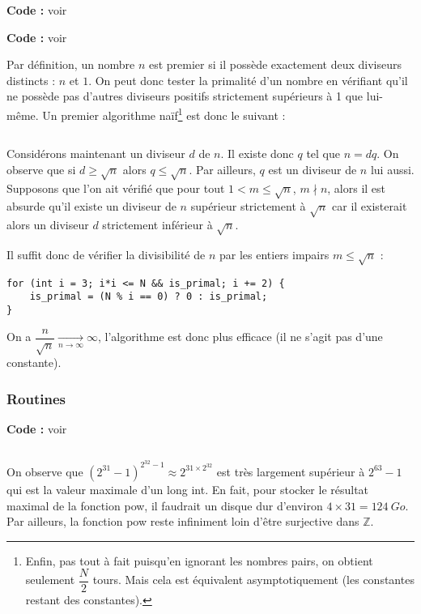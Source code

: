 \documentclass[../main.tex]{subfiles}
\begin{document}

\textbf{Code :} voir 


\textbf{Code :} voir 

\newline
Par définition, un nombre $n$ est premier si il possède exactement deux diviseurs distincts : $n$ et $1$. On peut donc tester la primalité d'un nombre en vérifiant qu'il ne possède pas d'autres diviseurs positifs strictement supérieurs à 1 que lui-même. Un premier algorithme naïf\footnote{Enfin, pas tout à fait puisqu'en ignorant les nombres pairs, on obtient seulement $\dfrac{N}{2}$ tours. Mais cela est équivalent asymptotiquement (les constantes restant des constantes).} est donc le suivant :
\inputminted{c}{solutions/part2/chapter2/primal_test.c}
Considérons maintenant un diviseur $d$ de $n$. Il existe donc $q$ tel que $n = dq$. On observe que si $d \geq \sqrt{n}$ alors $q \leq{\sqrt{n}}$. Par ailleurs, $q$ est un diviseur de $n$ lui aussi. Supposons que l'on ait vérifié que pour tout $1 < m \leq \sqrt{n}$, $m\nmid{n}$, alors il est absurde qu'il existe un diviseur de $n$ supérieur strictement à $\sqrt{n}$ car il existerait alors un diviseur $d$ strictement inférieur à $\sqrt{n}$.
 
Il suffit donc de vérifier la divisibilité de $n$ par les entiers impairs $m\leq{\sqrt{n}}$ :
\begin{verbatim}
for (int i = 3; i*i <= N && is_primal; i += 2) {
	is_primal = (N % i == 0) ? 0 : is_primal;
}
\end{verbatim}
On a $\dfrac{n}{\sqrt{n}}\underset{n\rightarrow{\infty}}{\rightarrow}\infty$, l'algorithme est donc plus efficace (il ne s'agit pas d'une constante).
\subsubsection{Routines}

\textbf{Code :} voir 

\inputminted{c}{solutions/part2/chapter2/int_pow.c}
On observe que $(2^{31}-1)^{2^{32}-1}\approx{2^{31\times{2^{32}}}}$ est très largement supérieur à $2^{63} - 1$ qui est la valeur maximale d'un \textsf{long int}. En fait, pour stocker le résultat maximal de la fonction \textsf{pow}, il faudrait un disque dur d'environ $4\times{31} = 124\ Go$. Par ailleurs, la fonction \textsf{pow} reste infiniment loin d'être surjective dans $\mathbb{Z}$.
\end{document}
